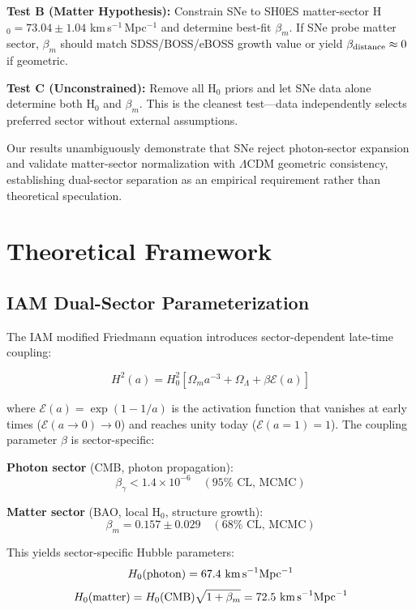 \documentclass[twocolumn,superscriptaddress,prd,amsmath,amssymb]{revtex4-2}
\begin{document}
\textbf{Test B (Matter Hypothesis):} Constrain SNe to SH0ES matter-sector H$_0 = 73.04 \pm 1.04$ km\,s$^{-1}$\,Mpc$^{-1}$ and determine best-fit $\beta_m$. If SNe probe matter sector, $\beta_m$ should match SDSS/BOSS/eBOSS growth value or yield $\beta_{\rm distance} \approx 0$ if geometric.

\textbf{Test C (Unconstrained):} Remove all H$_0$ priors and let SNe data alone determine both H$_0$ and $\beta_m$. This is the cleanest test—data independently selects preferred sector without external assumptions.

Our results unambiguously demonstrate that SNe reject photon-sector expansion and validate matter-sector normalization with $\Lambda$CDM geometric consistency, establishing dual-sector separation as an empirical requirement rather than theoretical speculation.

\section{Theoretical Framework}

\subsection{IAM Dual-Sector Parameterization}

The IAM modified Friedmann equation introduces sector-dependent late-time coupling:

\begin{equation}
H^2(a) = H_0^2\left[\Omega_m a^{-3} + \Omega_\Lambda + \beta \mathcal{E}(a)\right]
\label{eq:friedmann}
\end{equation}

where $\mathcal{E}(a) = \exp(1 - 1/a)$ is the activation function that vanishes at early times ($\mathcal{E}(a \to 0) \to 0$) and reaches unity today ($\mathcal{E}(a=1) = 1$). The coupling parameter $\beta$ is sector-specific:

\textbf{Photon sector} (CMB, photon propagation):
\begin{equation}
\beta_\gamma < 1.4 \times 10^{-6} \quad (95\% \text{ CL, MCMC})
\end{equation}

\textbf{Matter sector} (BAO, local H$_0$, structure growth):
\begin{equation}
\beta_m = 0.157 \pm 0.029 \quad (68\% \text{ CL, MCMC})
\end{equation}

This yields sector-specific Hubble parameters:
\begin{equation}
H_0(\text{photon}) = 67.4 \text{ km\,s}^{-1}\text{Mpc}^{-1}
\end{equation}
\begin{equation}
H_0(\text{matter}) = H_0(\text{CMB})\sqrt{1+\beta_m} = 72.5 \text{ km\,s}^{-1}\text{Mpc}^{-1}
\end{equation}
\end{document}
